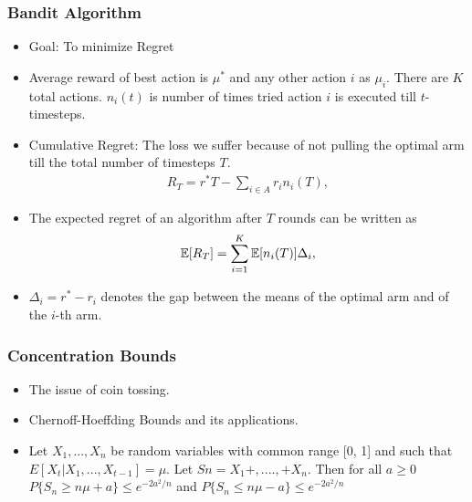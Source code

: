 \documentclass{beamer}
\begin{document}
\begin{frame}
\frametitle{Bandit Algorithm}
\begin{itemize}
\item Goal: To minimize Regret
\item Average reward of best action is $\mu^{*}$ and any other action $i$ as $\mu_{i}$. There are $K$ total actions. $n_{i}(t)$ is number of times tried action $i$ is executed till $t$-timesteps.
\item Cumulative Regret: The loss we suffer because of not pulling the optimal arm till the total number of timesteps  $T$. 
\begin{align*}
R_{T}=r^{*}T - \sum_{i\in A} r_{i}n_{i}(T),
\end{align*}
\item The expected regret of an algorithm after $T$ rounds can be written as
\begin{align*}
\mathbb{E}[R_{T}]= \sum_{i=1}^K \mathbb{E}[n_{i}(T)] \Delta_i,
\end{align*}
\item $\Delta_{i}=r^{*}-r_{i}$ denotes the gap between the means of the optimal arm and of the $i$-th arm. 
\end{itemize}
\end{frame}


\begin{frame}
\frametitle{Concentration Bounds}
\begin{itemize}
\item The issue of coin tossing.
\item Chernoff-Hoeffding Bounds and its applications.
\item Let $X_{1}, . . . , X_{n}$ be random variables with common
range [0, 1] and such that $E[X_{t} |X_{1}, . . . , X_{t-1}] = \mu.$ Let $Sn = X_{1} +,....,+ X_{n}$. Then for
all $a \geq 0$
\newline
$P\lbrace S_{n} \geq n\mu + a \rbrace \leq e^{-2a^{2}/n}$ and $P\lbrace S_{n} \leq n\mu - a \rbrace \leq e^{-2a^{2}/n}$
\end{itemize}
\end{frame}
\end{document}
